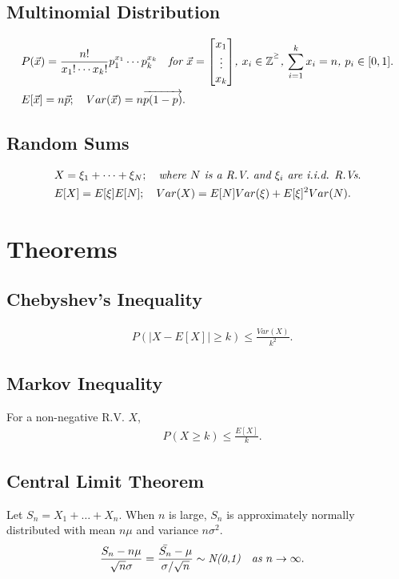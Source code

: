\documentclass{article}
\begin{document}
\subsection{Multinomial Distribution}
\begin{align*}
    & P(\vec{x}) = \frac{n!}{x_1!\cdots x_k!}p_1^{x_1}\cdots p_k^{x_k} \quad \emph{for $\vec{x} = \begin{bmatrix}
        x_1 \\ \vdots \\ x_k
    \end{bmatrix}$, $x_i\in \mathbb{Z^{^\ge}}$, $\sum_{i=1}^k x_i = n$, $p_i\in [0,1]$}. \\
    & E[\vec{x}] = n\vec{p}; \quad Var(\vec{x}) = n\overrightarrow{p(1-p)}.
\end{align*}

\subsection{Random Sums}
\begin{align*}
    & X = \xi_1 + \dots + \xi_N; \quad \emph{where $N$ is a R.V. and $\xi_i$ are i.i.d. R.Vs}. \\
    & E[X] = E[\xi]E[N]; \quad Var(X) = E[N]Var(\xi) + E[\xi]^2Var(N).
\end{align*}

\newpage
\section{Theorems}
\subsection{Chebyshev's Inequality}
\begin{align*}
    & P(|X-E[X]| \ge k) \le \frac{Var(X)}{k^2}.
\end{align*}

\subsection{Markov Inequality}
For a non-negative R.V. $X$,
\begin{align*}
    & P(X \ge k) \le \frac{E[X]}{k}.
\end{align*}

\subsection{Central Limit Theorem}
Let $S_n = X_1 + \dots + X_n$. When $n$ is large, $S_n$ is approximately normally distributed with mean $n\mu $ and variance $n\sigma^2$.
\begin{align*}
    & \frac{S_n-n\mu}{\sqrt{n}\sigma} = \frac{\bar{S_n} - \mu}{\sigma / \sqrt{n}} \sim \emph{N(0,1)} \quad \emph{as $n\to\infty$}.
\end{align*}
\end{document}
